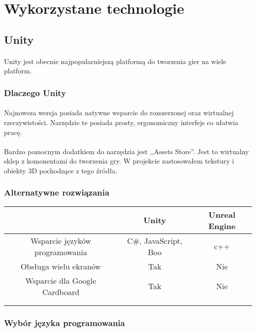 \section{Wykorzystane technologie}

\subsection{Unity}
\paragraph{}
Unity jest obecnie najpopularniejszą platformą do tworzenia gier na wiele platform. 
\subsubsection{Dlaczego Unity}
\paragraph{}
Najnowsza wersja posiada natywne wsparcie do rozszerzonej oraz wirtualnej rzeczywistości. Narzędzie te posiada prosty, ergonomiczny interfejs co ułatwia pracę.
\paragraph{}
Bardzo pomocnym dodatkiem do narzędzia jest ,,Assets Store''. Jest to wirtualny sklep z komonentami do tworzenia gry. W projekcie zastosowałem tekstury i obiekty 3D pochodzące z tego źródła.
\subsubsection{Alternatywne rozwiązania}
 \begin{tabular}{|c|c|c|}
 \hline
 \ & Unity & Unreal Engine \\ 
  \hline
 Wsparcie języków programowania & C\#, JavaScript, Boo & c++ \\  
  \hline
 Obsługa wielu ekranów & Tak & Nie \\
 \hline  
  Wsparcie dla Google Cardboard & Tak & Nie \\
  \hline   
  &  &  \\
  \hline   
  &  &  \\
  \hline   
\end{tabular}

\subsubsection{Wybór języka programowania}
